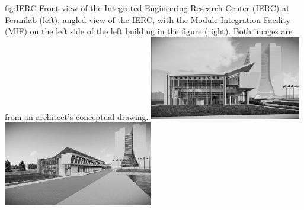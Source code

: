 \begin{dunefigure}{fig:IERC}
{Front view of the Integrated Engineering Research Center (IERC) at Fermilab (left); angled view of the IERC, with the Module Integration Facility (MIF) on the left side of the left building in the figure (right).  Both images are from an architect's conceptual drawing.}
\includegraphics[width=0.495\textwidth]{graphics/lartpc/Construction/MIF-Drawing-1.png}
\includegraphics[width=0.49\textwidth]{graphics/lartpc/Construction/MIF-Drawing-2.png}
\end{dunefigure}

